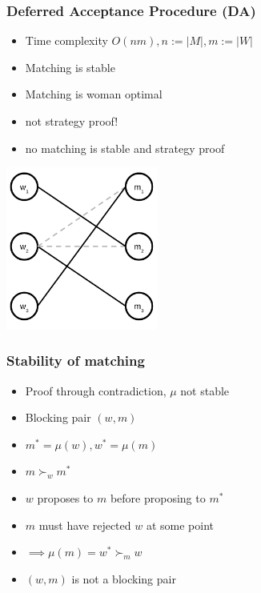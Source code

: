 \begin{frame} 
\frametitle{Deferred Acceptance Procedure (DA)}
\begin{itemize}[<+->]
    \item Time complexity $O(nm), n:=|M|,m:=|W|$
    \item Matching is stable
    \item Matching is woman optimal
    \item not strategy proof!
    \item no matching is stable and strategy proof
\end{itemize}
\centering
\includegraphics[width=5cm]{img/matching/da5.png}
\end{frame}

\begin{frame}
\frametitle{Stability of matching \mu}
\begin{itemize}[<+->]
    \item Proof through contradiction, $\mu$ not stable
    \item Blocking pair $(w,m)$
    \item $m^* = \mu(w), w^* = \mu(m)$
    \item $m \succ_w m^*$
    \item $w$ proposes to $m$ before proposing to $m^*$ 
    \item $m$ must have rejected $w$ at some point
    \item $\implies \mu(m) = w^* \succ_m w$
    \item $(w,m)$ is not a blocking pair
\end{itemize}
\end{frame}

